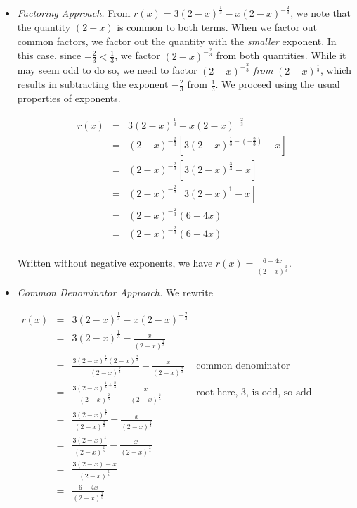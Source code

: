 \documentclass{ximera}
\begin{document}
\begin{example}
\begin{enumerate}
\begin{itemize}

\item  \textit{Factoring Approach.}  From $r(x) = 3 (2-x)^{\frac{1}{3}} - x (2-x)^{-\frac{2}{3}}$, we note that the quantity $(2-x)$ is common to both terms.  When we factor out common factors, we factor out the quantity with the \textit{smaller} exponent.  In this case, since $-\frac{2}{3} < \frac{1}{3}$, we factor $(2-x)^{-\frac{2}{3}}$ from both quantities.  While it may seem odd to do so, we need to factor $(2-x)^{-\frac{2}{3}}$ \textit{from} $(2-x)^{\frac{1}{3}}$, which results in subtracting the exponent $-\frac{2}{3}$ from $\frac{1}{3}$.  We proceed using the usual properties of exponents.

\[ \begin{array}{rclr}

r(x)  & = & 3 (2-x)^{\frac{1}{3}} - x (2-x)^{-\frac{2}{3}} & \\  
      & = & (2-x)^{-\frac{2}{3}} \left[ 3 (2-x)^{\frac{1}{3} - \left(-\frac{2}{3}\right)} - x\right] & \\  
      & = & (2-x)^{-\frac{2}{3}}\left[3(2-x)^{\frac{3}{3}} - x\right] & \\  
      & = & (2-x)^{-\frac{2}{3}}\left[3(2-x)^{1} - x\right] &  \\  
      & = & (2-x)^{-\frac{2}{3}}\left(6-4x\right) & \\  
      & = & (2-x)^{-\frac{2}{3}}\left(6-4x\right) & \\
      
\end{array}\]

Written without negative exponents, we have $r(x) = \frac{6-4x}{(2-x)^{\frac{2}{3}}}$.


\item \textit{Common Denominator Approach.}  We rewrite 

\[ \begin{array}{rclr}

r(x)  & = & 3 (2-x)^{\frac{1}{3}} - x (2-x)^{-\frac{2}{3}} & \\  
      & = & 3 (2-x)^{\frac{1}{3}} - \frac{x}{(2-x)^{\frac{2}{3}}} & \\  
      & = & \frac{3 (2-x)^{\frac{1}{3}}(2-x)^{\frac{2}{3}}}{(2-x)^{\frac{2}{3}}} - \frac{x}{(2-x)^{\frac{2}{3}}} & \text{common denominator} \\  
      & = & \frac{3 (2-x)^{\frac{1}{3} + \frac{2}{3}}}{(2-x)^{\frac{2}{3}}} - \frac{x}{(2-x)^{\frac{2}{3}}} & \text{root here, 3, is odd, so add exponents}  \\  
      & = & \frac{3 (2-x)^{\frac{3}{3}}}{(2-x)^{\frac{2}{3}}} - \frac{x}{(2-x)^{\frac{2}{3}}} & \\  
      & = & \frac{3 (2-x)^1}{(2-x)^{\frac{2}{3}}} - \frac{x}{(2-x)^{\frac{2}{3}}} &  \\  
      & = & \frac{3 (2-x) - x}{(2-x)^{\frac{2}{3}}} & \\  
      & = & \frac{6-4x}{(2-x)^{\frac{2}{3}}} & \\


\end{array}\]
\end{itemize}
\end{enumerate}
\end{example}
\end{document}
